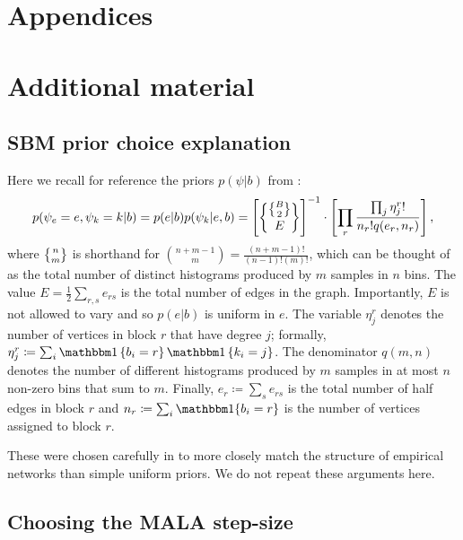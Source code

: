 \section*{Appendices}

\section{Additional material}
\subsection{SBM prior choice explanation}
\label{appdx:prior}

Here we recall for reference
the priors $p(\psi | b)$ from \cite{Peixoto-Bayesian-Microcanonical}:
%
\begin{equation}
	p(\psi_e=e, \psi_k=k | b) = p(e | b) p(\psi_k | e, b) = \left[ \specialchoose{ \specialchoose{B}{2} }{ E} \right]^{-1} 
	\cdot \left[ \prod_r \frac{\prod_j \eta_j^r !}{n_r! q(e_r, n_r)} \right],
\end{equation}
%
where $\specialchoose{n}{m}$ is shorthand 
for $\binom{n+m-1}{m} = \frac{(n+m-1)!}{(n-1)!(m)!}$,
which can be thought of as the total number of distinct histograms 
produced by $m$ samples in $n$ bins.
The value
$E = \frac{1}{2} \sum_{r,s} e_{rs}$ is the total number of edges in the graph. 
Importantly, $E$ is not allowed to vary and so $p(e|b)$ is uniform in $e$.
The variable $\eta_j^r$ denotes the number of vertices in block $r$ 
that have degree $j$; formally, $\eta_j^r \coloneqq \sum_{i} \one\left\{b_i = r \right\} \one \left\{k_i = j \right\}$. 
The denominator $q(m, n)$ denotes the number of different histograms 
produced by $m$ samples in 
at most $n$ non-zero bins that sum to $m$. 
Finally, $e_r \coloneqq \sum_{s} e_{rs}$ is the total number 
of half edges in block $r$ and $n_r \coloneqq \sum_{i} \one\{b_i = r\}$ 
is the number of vertices assigned to block $r$. 

These were chosen carefully in \cite{Peixoto-Bayesian-Microcanonical} to 
more closely match the structure of empirical networks than simple 
uniform priors. We do not repeat these arguments here.

\subsection{Choosing the MALA step-size}
\label{appdx:step-size}


